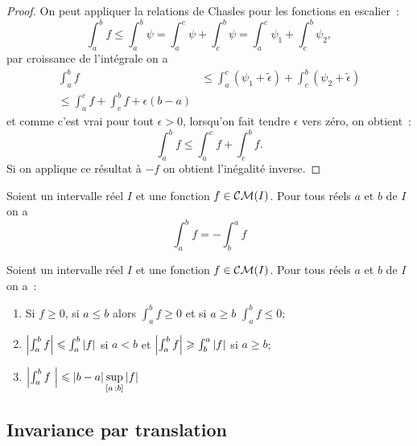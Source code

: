 \begin{proof}
  On peut appliquer la relations de Chasles pour les fonctions en escalier~:
  \begin{equation}
    \int_a^b f \leqslant \int_a^b \psi = \int_a^c \psi + \int_c^b \psi= \int_a^c \psi_1 + \int_c^b \psi_2,
  \end{equation}
  par croissance de l'intégrale on a
  \begin{align}
    \int_a^b f & \leqslant \int_a^c (\psi_1 + \tilde{\epsilon})  + \int_c^b (\psi_2 + \tilde{\epsilon}) \\
    \leqslant \int_a^c f + \int_c^b f + \epsilon(b-a)
  \end{align}
  et comme c'est vrai pour tout \(\epsilon >0\), lorsqu'on fait tendre \(\epsilon\) vers zéro, on obtient~:
  \begin{equation}
    \int_a^b f \leqslant \int_a^c f + \int_c^b f.
  \end{equation}
  Si on applique ce résultat à \(-f\) on obtient l'inégalité inverse.
\end{proof}

\begin{prop}
  Soient un intervalle réel \(I\) et une fonction \(f \in \mathcal{CM}(I)\). Pour tous réels \(a\) et \(b\) de \(I\) on a
  \begin{equation}
    \int_a^b f = - \int_b^a f
  \end{equation}
\end{prop}

\begin{theo}
  Soient un intervalle réel \(I\) et une fonction \(f \in \mathcal{CM}(I)\). Pour tous réels \(a\) et \(b\) de \(I\) on a~:
  \begin{enumerate}
  \item Si \(f \geqslant 0\), si \(a \leqslant b\) alors \(\int_a^bf \geqslant 0\) et si \(a \geqslant b\) \(\int_a^b f \leqslant 0\);
  \item \(\left\lvert\int_a^b f\right\rvert \leqslant \int_a^b \left\lvert f\right\rvert\) si \(a<b\) et \(\left\lvert\int_a^b f\right\rvert \geqslant \int_b^a \left\lvert f\right\rvert\) si \(a \geqslant b\);
  \item \(\left\lvert\int_a^b f~\right\rvert \leqslant \left\lvert b-a\right\rvert \sup\limits_{\left[ a \, ;  b \right]} \left\lvert f\right\rvert\)
  \end{enumerate}
\end{theo}

\subsection{Invariance par translation}

